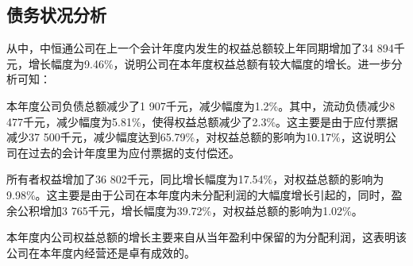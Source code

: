 \subsection{债务状况分析}{}
从中，中恒通公司在上一个会计年度内发生的权益总额较上年同期增加了34 894千元，增长幅度为9.46\%，说明公司在本年度权益总额有较大幅度的增长。进一步分析可知：
\begin{compactenum}[(1) ]
 \item 本年度公司负债总额减少了1 907千元，减少幅度为1.2\%。其中，流动负债减少8 477千元，减少幅度为5.81\%，使得权益总额减少了2.3\%。这主要是由于应付票据减少37 500千元，减少幅度达到65.79\%，对权益总额的影响为10.17\%，这说明公司在过去的会计年度里为应付票据的支付偿还。
 \item 所有者权益增加了36 802千元，同比增长幅度为17.54\%，对权益总额的影响为9.98\%。这主要是由于公司在本年度内未分配利润的大幅度增长引起的，同时，盈余公积增加3 765千元，增长幅度为39.72\%，对权益总额的影响为1.02\%。
 \item 本年度内公司权益总额的增长主要来自从当年盈利中保留的为分配利润，这表明该公司在本年度内经营还是卓有成效的。
\end{compactenum}











